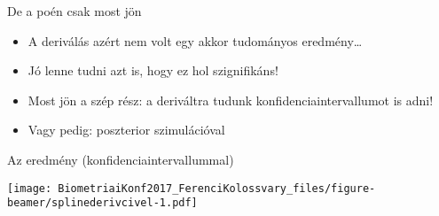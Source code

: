 \documentclass[ignorenonframetext,]{beamer}
\newenvironment{Shaded}{\begin{snugshade}}{\end{snugshade}}
\newcommand{\KeywordTok}[1]{\textcolor[rgb]{0.13,0.29,0.53}{\textbf{{#1}}}}
\newcommand{\DataTypeTok}[1]{\textcolor[rgb]{0.13,0.29,0.53}{{#1}}}
\newcommand{\DecValTok}[1]{\textcolor[rgb]{0.00,0.00,0.81}{{#1}}}
\newcommand{\StringTok}[1]{\textcolor[rgb]{0.31,0.60,0.02}{{#1}}}
\newcommand{\NormalTok}[1]{{#1}}
\providecommand{\tightlist}{%
\setlength{\itemsep}{0pt}\setlength{\parskip}{0pt}}
\begin{document}
\begin{frame}[fragile]{De a poén csak most jön}

\begin{itemize}
\tightlist
\item
  A deriválás azért nem volt egy akkor tudományos eredmény\dots{}
\item
  Jó lenne tudni azt is, hogy ez hol szignifikáns!
\item
  Most jön a szép rész: a deriváltra tudunk konfidenciaintervallumot is
  adni!
\end{itemize}

\begin{Shaded}
\end{Shaded}

\begin{itemize}
\tightlist
\item
  Vagy pedig: poszterior szimulációval
\end{itemize}

\end{frame}

\begin{frame}{Az eredmény (konfidenciaintervallummal)}

\texttt{[image: BiometriaiKonf2017\_FerenciKolossvary\_files/figure-beamer/splinederivcivel-1.pdf]}

\end{frame}
\end{document}
